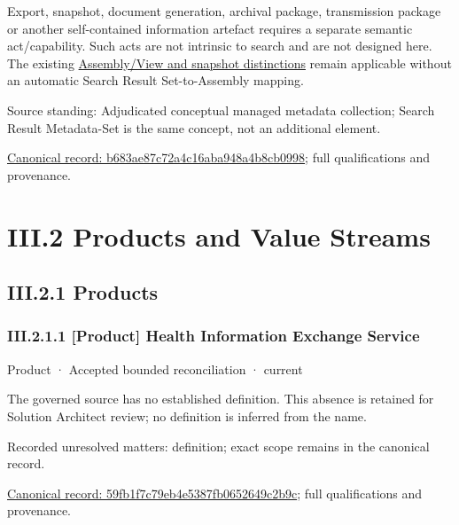 Export, snapshot, document generation, archival package, transmission package
or another self-contained information artefact requires a separate semantic
act/capability. Such acts are not intrinsic to search and are not designed here.
The existing \href{\detokenize{../../../../../docs/markdown/04-information-architecture/assemblies-views/assemblies-and-views.md#3-assembly-lifecycle-vs-constituent-lifecycle}}{Assembly/View and snapshot distinctions}
remain applicable without an automatic Search Result Set-to-Assembly mapping.



Source standing: Adjudicated conceptual managed metadata collection; Search Result Metadata-Set is the same concept, not an additional element.


{\footnotesize \href{../../../../continuum/business/business-object/b683ae87c72a4c16aba948a4b8cb0998.md}{Canonical record: b683ae87c72a4c16aba948a4b8cb0998}; full qualifications and provenance.}\par
\chapter*{III.2 Products and Value Streams}
\label{navigation:III.2}

\section*{III.2.1 Products}
\label{navigation:III.2.1}

\subsection*{III.2.1.1 [Product] Health Information Exchange Service}
\label{navigation:III.2.1.1}

\label{element:59fb1f7c79eb4e5387fb0652649c2b9c}
{\small Product · Accepted bounded reconciliation · current}\par

The governed source has no established definition. This absence is retained for Solution Architect review; no definition is inferred from the name.


{\small Recorded unresolved matters: definition; exact scope remains in the canonical record.}\par
{\footnotesize \href{../../../../continuum/business/product/59fb1f7c79eb4e5387fb0652649c2b9c.md}{Canonical record: 59fb1f7c79eb4e5387fb0652649c2b9c}; full qualifications and provenance.}\par
